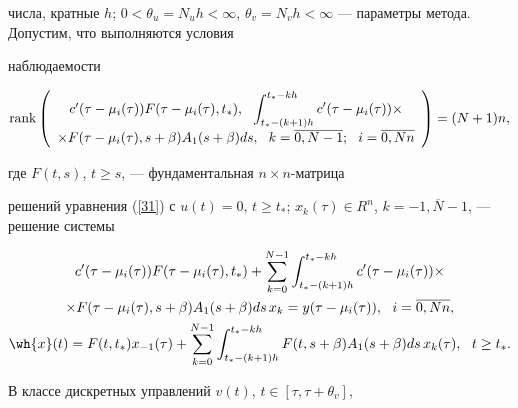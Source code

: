 числа, кратные $h$; $0<\theta_u=N_u h<\infty$, $\theta_v=N_v h <


\infty$ --- параметры метода. Допустим, что выполняются условия


наблюдаемости


$$


\rank \left(


\begin{array}{c}


c'(\tau-\mu_{i}(\tau))F(\tau-\mu_i(\tau), t_*),


\ \ \displaystyle \int_{t_*-(k+1)h}^{t_*-kh}


c'(\tau-\mu_i(\tau)) \times \\[3mm] \times


F(\tau-\mu_i(\tau),s+\beta)


A_1(s+\beta)ds,\ \ k=\overline{0,N-1};


\ \ i=\overline{0,Nn}


\end{array} \right)=(N+1)n,


$$


где $F(t,s)$, $t \ge s$, --- фундаментальная $n \times n$-матрица


решений уравнения (\ref{31}) с $u(t)=0$, $t \ge t_*$; $x_{k}(\tau) \in


R^n$, $k=\overline{-1, N-1}$, --- решение системы


\begin{gather*}


c'(\tau-\mu_{i}(\tau))F(\tau-\mu_i(\tau), t_*)


+\sum^{N-1}_{k=0}


\int_{t_*-(k+1)h}^{t_*-kh}c'(\tau-\mu_i(\tau))\times \\


%


\times F(\tau-\mu_i(\tau),s+\beta)


A_1(s+\beta)ds\, x_k=y(\tau-\mu_i(\tau)),\ \ i=\overline{0,Nn}, \\


%


\wh{x}(t)=F(t,t_*)x_{-1}(\tau)+\sum_{k=0}^{N-1}


\int_{t_{*}-(k+1)h}^{t_{*}-kh}F(t,s+\beta)A_1(s+\beta)


ds\, x_k(\tau),\ \ t \ge t_*.


\end{gather*}





В классе дискретных управлений $v(t)$, $t \in [\tau,\tau+\theta_v]$, \tts{[}


